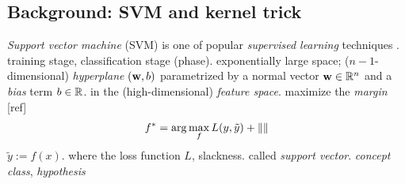 \subsection{Background: SVM and kernel trick}\label{sec:svm}
\emph{Support vector machine} (SVM) is one of popular \emph{supervised learning} techniques \cite{cortesSupportvectorNetworks1995}.
training stage, classification stage (phase).
exponentially large space;
($n-1$-dimensional) \emph{hyperplane} $(\vb{w},b)$ parametrized by a normal vector $\vb{w}\in\mathbb{R}^n$ and a \emph{bias} term $b\in\mathbb{R}$. in the (high-dimensional) \emph{feature space}.
maximize the \emph{margin} [ref]
\begin{equation}
	f^* = \arg \max_f  L(y,\tilde{y}) + \norm{}
\end{equation}
$\tilde{y}:=f(x)$.
where the loss function $L$, slackness. 
called \emph{support vector}. \emph{concept class}, \emph{hypothesis}

